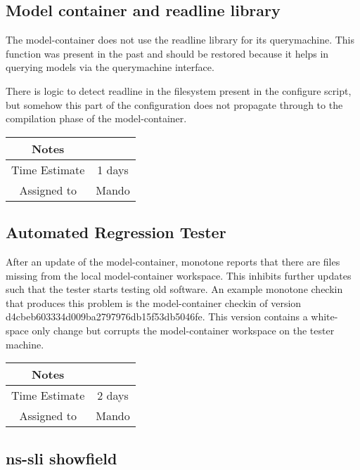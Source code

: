 \documentclass[12pt]{article}
\begin{document}
\subsection{Model container and readline library}

The model-container does not use the readline library for its
querymachine.  This function was present in the past and should be
restored because it helps in querying models via the querymachine
interface.

There is logic to detect readline in the filesystem present in the
configure script, but somehow this part of the configuration does not
propagate through to the compilation phase of the model-container.

{
  \vspace{5mm}
  \centering
  \begin{tabular}{|c|c|}
    \hline
    Notes
    & \\
    \hline
    Time Estimate
    & 1 days \\
    \hline
    Assigned to
    & Mando \\
    \hline
  \end{tabular}
}


\subsection{Automated Regression Tester}

After an update of the model-container, monotone reports that there
are files missing from the local model-container workspace.  This
inhibits further updates such that the tester starts testing old
software.  An example monotone checkin that produces this problem is
the model-container checkin of version
d4cbeb603334d009ba2797976db15f53db5046fe.  This version contains a
white-space only change but corrupts the model-container workspace on
the tester machine.

{
  \vspace{5mm}
  \centering
  \begin{tabular}{|c|c|}
    \hline
    Notes
    & \\
    \hline
    Time Estimate
    & 2 days \\
    \hline
    Assigned to
    & Mando \\
    \hline
  \end{tabular}
}


\subsection{ns-sli showfield}
\end{document}
